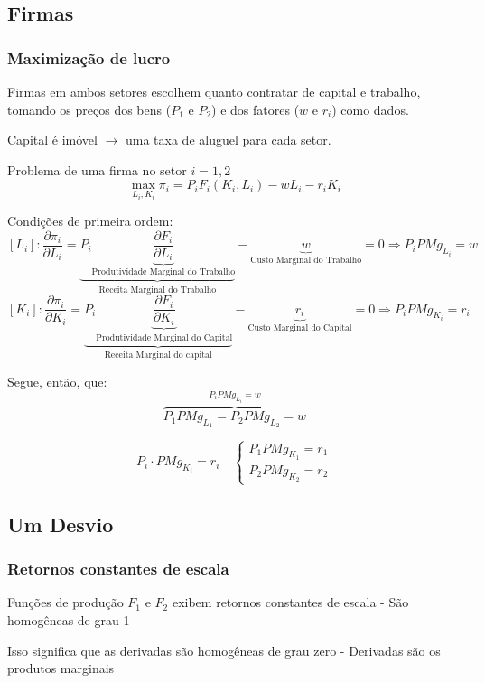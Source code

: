\documentclass[a4paper,12pt]{article}[abntex2]
\begin{document}
\subsection{\textbf{Firmas}}
\subsubsection{\textbf{Maximização de lucro}}
Firmas em ambos setores escolhem quanto contratar de capital e trabalho, tomando os preços dos bens ($P_1$ e $P_2$) e dos fatores ($w$ e $r_i$) como dados.

Capital é imóvel $\rightarrow$ uma taxa de aluguel para cada setor.

Problema de uma firma no setor $i = 1, 2$
\[
\max_{L_i, K_i} \pi_i = P_i F_i(K_i, L_i) - w L_i - r_i K_i
\]

Condições de primeira ordem:
\[
[L_i]:\frac{\partial \pi_i}{\partial L_i} =\underbrace{P_i \underbrace{\frac{\partial F_i}{\partial L_i}}_\text{Produtividade Marginal do Trabalho}}_\text{Receita Marginal do Trabalho} - \underbrace{w}_\text{Custo Marginal do Trabalho} = 0 \Rightarrow P_i PMg_{L_i} = w
\]
\[
[K_i]:\frac{\partial \pi_i}{\partial K_i} = \underbrace{P_i \underbrace{\frac{\partial F_i}{\partial K_i}}_\text{Produtividade Marginal do Capital}}_\text{Receita Marginal do capital} - \underbrace{r_i}_\text{Custo Marginal do Capital} = 0 \Rightarrow P_i PMg_{K_i} = r_i
\]

Segue, então, que:
\[
\overbrace{P_1 PMg_{L_1} = P_2 PMg_{L_2} = w}^{P_i PMg_{L_i} = w}
\]

\[
P_i \cdot PMg_{K_i} = r_i \quad \begin{cases}
    P_1 PMg_{K_1} = r_1 \\
    P_2 PMg_{K_2} = r_2
\end{cases}
\]



\subsection{\textbf{Um Desvio}}
\subsubsection{\textbf{Retornos constantes de escala}}
Funções de produção $F_1$ e $F_2$ exibem retornos constantes de escala  
- São homogêneas de grau 1

Isso significa que as derivadas são homogêneas de grau zero  
- Derivadas são os produtos marginais
\end{document}
